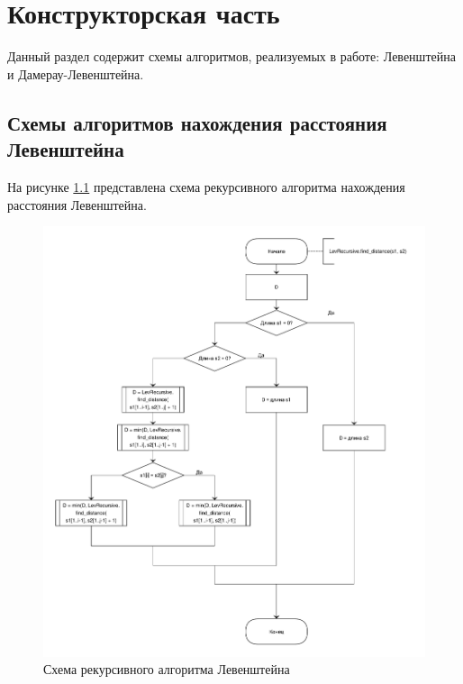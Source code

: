 \documentclass[a4paper,oneside,14pt]{extreport}
\begin{document}
\chapter{Конструкторская часть}
Данный раздел содержит схемы алгоритмов, реализуемых в работе: Левенштейна и Дамерау-Левенштейна.
\section{Схемы алгоритмов нахождения расстояния Левенштейна}

На рисунке \ref{fig:rec_lev} представлена схема рекурсивного алгоритма нахождения расстояния Левенштейна.
\begin{figure}[H]
	\centering
	\includegraphics[width=1.05\linewidth, height=1.4\linewidth]{images/levenshtain_recursive}
	\caption{Схема рекурсивного алгоритма Левенштейна}
	\label{fig:rec_lev}
\end{figure}
\end{document}
